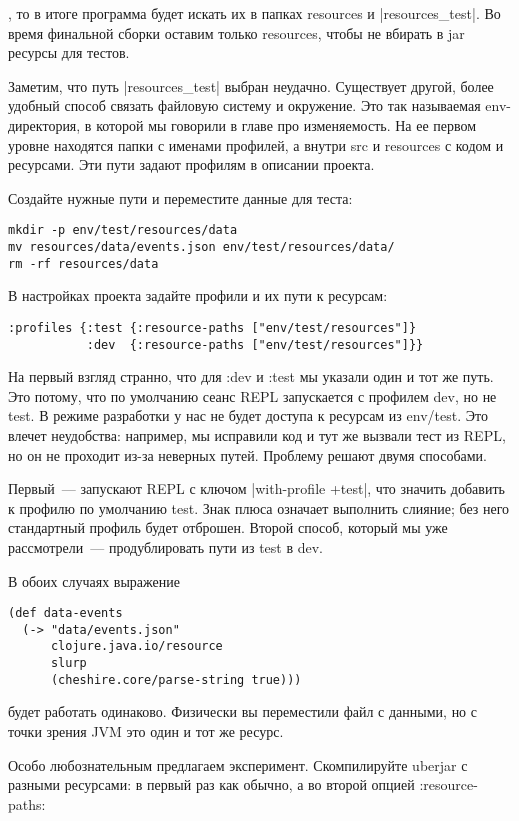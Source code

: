 , то в итоге программа будет искать их в папках resources и \spverb|resources_test|. Во
время финальной сборки оставим только resources, чтобы не вбирать в jar ресурсы
для тестов.

Заметим, что путь \spverb|resources_test| выбран неудачно. Существует другой, более
удобный способ связать файловую систему и окружение. Это так называемая
env-директория, в которой мы говорили в главе про изменяемость. На ее первом
уровне находятся папки с именами профилей, а внутри src и resources с кодом и
ресурсами. Эти пути задают профилям в описании проекта.

Создайте нужные пути и переместите данные для теста:

\begin{verbatim}
mkdir -p env/test/resources/data
mv resources/data/events.json env/test/resources/data/
rm -rf resources/data
\end{verbatim}

В настройках проекта задайте профили и их пути к ресурсам:

\begin{verbatim}
:profiles {:test {:resource-paths ["env/test/resources"]}
           :dev  {:resource-paths ["env/test/resources"]}}
\end{verbatim}

На первый взгляд странно, что для :dev и :test мы указали один и тот же
путь. Это потому, что по умолчанию сеанс REPL запускается с профилем dev, но не
test. В режиме разработки у нас не будет доступа к ресурсам из env/test. Это
влечет неудобства: например, мы исправили код и тут же вызвали тест из REPL, но
он не проходит из-за неверных путей. Проблему решают двумя способами.

Первый~--- запускают REPL с ключом \spverb|with-profile +test|, что значить добавить к
профилю по умолчанию test. Знак плюса означает выполнить слияние; без него
стандартный профиль будет отброшен. Второй способ, который мы уже рассмотрели~---
продублировать пути из test в dev.

В обоих случаях выражение

\begin{verbatim}
(def data-events
  (-> "data/events.json"
      clojure.java.io/resource
      slurp
      (cheshire.core/parse-string true)))
\end{verbatim}

будет работать одинаково. Физически вы переместили файл с данными, но с точки
зрения JVM это один и тот же ресурс.

Особо любознательным предлагаем эксперимент. Скомпилируйте uberjar с разными
ресурсами: в первый раз как обычно, а во второй опцией :resource-paths:

